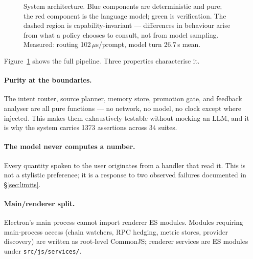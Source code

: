 \documentclass[10pt,twocolumn]{article}
\newcommand{\code}[1]{\texttt{\small #1}}
\begin{document}
\begin{figure}[t]
\caption{System architecture. Blue components are deterministic and pure; the red
component is the language model; green is verification. The dashed region is
capability-invariant --- differences in behaviour arise from what a policy chooses to
consult, not from model sampling. Measured: routing 102\,$\mu$s/prompt, model turn
26.7\,s mean.}
\label{fig:arch}
\end{figure}

Figure~\ref{fig:arch} shows the full pipeline. Three properties characterise it.

\paragraph{Purity at the boundaries.} The intent router, source planner, memory store,
promotion gate, and feedback analyser are all pure functions --- no network, no model, no
clock except where injected. This makes them exhaustively testable without mocking an
LLM, and it is why the system carries 1373 assertions across 34 suites.

\paragraph{The model never computes a number.} Every quantity spoken to the user
originates from a handler that read it. This is not a stylistic preference; it is a
response to two observed failures documented in \S\ref{sec:limits}.

\paragraph{Main/renderer split.} Electron's main process cannot import renderer ES
modules. Modules requiring main-process access (chain watchers, RPC hedging, metric
stores, provider discovery) are written as root-level CommonJS; renderer services are ES
modules under \code{src/js/services/}.
\end{document}
